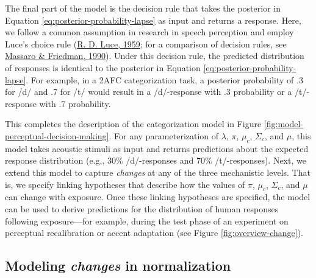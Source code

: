 \documentclass[
  11pt,
  english,
  man,floatsintext]{apa6}
\begin{document}
The final part of the model is the decision rule that takes the posterior in Equation \eqref{eq:posterior-probability-lapse} as input and returns a response. Here, we follow a common assumption in research in speech perception and employ Luce's choice rule (\protect\hyperlink{ref-luce1959}{R. D. Luce, 1959}; for a comparison of decision rules, see \protect\hyperlink{ref-massaro-friedman1990}{Massaro \& Friedman, 1990}). Under this decision rule, the predicted distribution of responses is identical to the posterior in Equation \eqref{eq:posterior-probability-lapse}. For example, in a 2AFC categorization task, a posterior probability of .3 for /d/ and .7 for /t/ would result in a /d/-response with .3 probability or a /t/-response with .7 probability.

This completes the description of the categorization model in Figure \ref{fig:model-perceptual-decision-making}. For any parameterization of \(\lambda\), \(\pi\), \(\mu_c\), \(\Sigma_c\), and \(\mu\), this model takes acoustic stimuli as input and returns predictions about the expected response distribution (e.g., 30\% /d/-responses and 70\% /t/-responses). Next, we extend this model to capture \emph{changes} at any of the three mechanistic levels. That is, we specify linking hypotheses that describe how the values of \(\pi\), \(\mu_c\), \(\Sigma_c\), and \(\mu\) can change with exposure. Once these linking hypotheses are specified, the model can be used to derive predictions for the distribution of human responses following exposure---for example, during the test phase of an experiment on perceptual recalibration or accent adaptation (see Figure \ref{fig:overview-change}).

\hypertarget{sec:change-normalization}{%
\subsection{\texorpdfstring{Modeling \emph{changes} in normalization}{Modeling changes in normalization}}\label{sec:change-normalization}}
\end{document}
